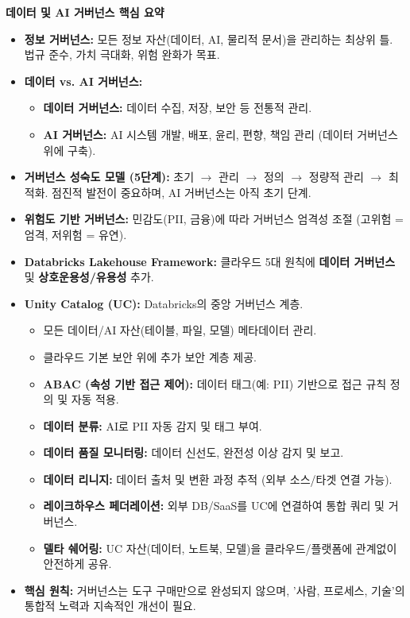 \documentclass[11pt,a4paper]{article}
\theoremstyle{definition}
\begin{document}
\begin{tcolorbox}[summarybox]
\textbf{데이터 및 AI 거버넌스 핵심 요약}

\begin{itemize}
    \item \textbf{정보 거버넌스:} 모든 정보 자산(데이터, AI, 물리적 문서)을 관리하는 최상위 틀. 법규 준수, 가치 극대화, 위험 완화가 목표.
    \item \textbf{데이터 vs. AI 거버넌스:}
    \begin{itemize}
        \item \textbf{데이터 거버넌스:} 데이터 수집, 저장, 보안 등 전통적 관리.
        \item \textbf{AI 거버넌스:} AI 시스템 개발, 배포, 윤리, 편향, 책임 관리 (데이터 거버넌스 위에 구축).
    \end{itemize}
    \item \textbf{거버넌스 성숙도 모델 (5단계):} 초기 $\rightarrow$ 관리 $\rightarrow$ 정의 $\rightarrow$ 정량적 관리 $\rightarrow$ 최적화. 점진적 발전이 중요하며, AI 거버넌스는 아직 초기 단계.
    \item \textbf{위험도 기반 거버넌스:} 민감도(PII, 금융)에 따라 거버넌스 엄격성 조절 (고위험 = 엄격, 저위험 = 유연).
    \item \textbf{Databricks Lakehouse Framework:} 클라우드 5대 원칙에 \textbf{데이터 거버넌스} 및 \textbf{상호운용성/유용성} 추가.
    \item \textbf{Unity Catalog (UC):} Databricks의 중앙 거버넌스 계층.
    \begin{itemize}
        \item 모든 데이터/AI 자산(테이블, 파일, 모델) 메타데이터 관리.
        \item 클라우드 기본 보안 위에 추가 보안 계층 제공.
        \item \textbf{ABAC (속성 기반 접근 제어):} 데이터 태그(예: PII) 기반으로 접근 규칙 정의 및 자동 적용.
        \item \textbf{데이터 분류:} AI로 PII 자동 감지 및 태그 부여.
        \item \textbf{데이터 품질 모니터링:} 데이터 신선도, 완전성 이상 감지 및 보고.
        \item \textbf{데이터 리니지:} 데이터 출처 및 변환 과정 추적 (외부 소스/타겟 연결 가능).
        \item \textbf{레이크하우스 페더레이션:} 외부 DB/SaaS를 UC에 연결하여 통합 쿼리 및 거버넌스.
        \item \textbf{델타 쉐어링:} UC 자산(데이터, 노트북, 모델)을 클라우드/플랫폼에 관계없이 안전하게 공유.
    \end{itemize}
    \item \textbf{핵심 원칙:} 거버넌스는 도구 구매만으로 완성되지 않으며, '사람, 프로세스, 기술'의 통합적 노력과 지속적인 개선이 필요.
\end{itemize}
\end{tcolorbox}
\end{document}
